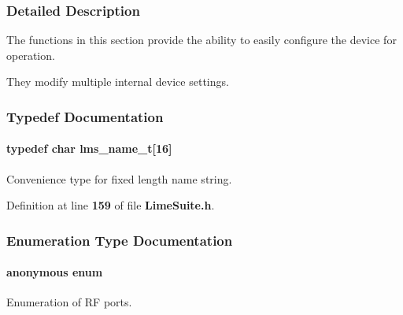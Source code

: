 \subsubsection{Detailed Description}
The functions in this section provide the ability to easily configure the device for operation. 

They modify multiple internal device settings. 

\subsubsection{Typedef Documentation}
\paragraph[{lms\+\_\+name\+\_\+t}]{\setlength{\rightskip}{0pt plus 5cm}typedef char lms\+\_\+name\+\_\+t[16]}\label{group__FN__HIGH__LVL_ga6af7301710d83c00a6904f14ed1e4a7d}


Convenience type for fixed length name string. 



Definition at line {\bf 159} of file {\bf Lime\+Suite.\+h}.



\subsubsection{Enumeration Type Documentation}
\paragraph[{anonymous enum}]{\setlength{\rightskip}{0pt plus 5cm}anonymous enum}\label{group__FN__HIGH__LVL_ga06fc87d81c62e9abb8790b6e5713c55b}


Enumeration of RF ports. 

